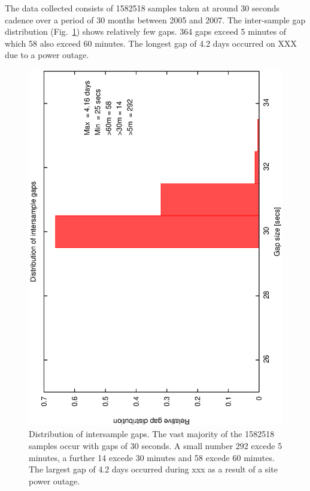 The data collected consists of 1582518 samples taken at around 30 seconds cadence over a period of 30 months between 2005 and 2007. The inter-sample gap distribution (Fig.~\ref{fig:gap_dist}) shows relatively few gaps. 364 gaps exceed 5 minutes of which 58 also exceed 60 minutes. The longest gap of 4.2 days occurred on XXX due to a power outage.  
\begin{figure}[htbp]
  \begin{center}
    \includegraphics[scale=0.4, angle=-90]{figures/ecs/gap_dist.eps}
  \end{center}
  \caption[Distribution of intersample gaps.]
{Distribution of intersample gaps. The vast majority of the 1582518 samples occur with gaps of 30 seconds. A small number 292 excede 5 minutes, a further 14 excede 30 minutes and 58 excede 60 minutes. The largest gap of 4.2 days occurred during xxx as a result of a site power outage.}
  \label{fig:gap_dist}
\end{figure}


